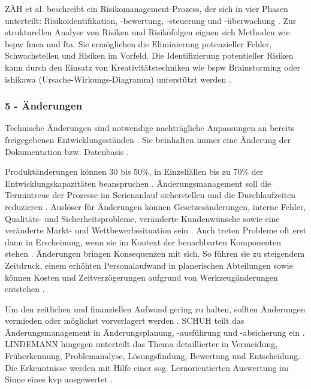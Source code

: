 ZÄH et al. beschreibt ein Risikomanagement-Prozess, der sich in vier Phasen unterteilt: Risikoidentifikation, -bewertung, -steuerung und -überwachung \cite{Zaeh2004}. 
Zur strukturellen Analyse von Risiken und Risikofolgen eignen sich  Methoden wie \gls{bspw} \gls{fmea} und \gls{fta}. Sie ermöglichen die Eliminierung potenzieller Fehler, Schwachstellen und Risiken im Vorfeld.
Die Identifizierung potentieller Risiken kann durch den Einsatz von Kreativitätstechniken wie \gls{bspw} Brainstorming oder \gls{ishikawa} (Ursache-Wirkungs-Diagramm) unterstützt werden \cite[41]{Bischoff2007}. 

\subsubsection*{5 - Änderungen}

Technische Änderungen sind notwendige nachträgliche Anpassungen an bereits freigegebenen Entwicklungsständen \cite{Zanner2002}. Sie beinhalten immer eine Änderung der Dokumentation bzw. Datenbasis \cite[47]{Niemerg1997}. 	

Produktänderungen können 30 bis 50\%, in Einzelfällen bis zu 70\% der Entwicklungskapazitäten beanspruchen \cite[2]{Lindemann1998}.
Änderungsmanagement soll die Termintreue der Prozesse im Serienanlauf sicherstellen und die Durchlaufzeiten reduzieren \cite[216]{Schuh2008}. 
Auslöser für Änderungen können Gesetzesänderungen, interne Fehler, Qualitäts- und Sicherheitsprobleme, veränderte Kundenwünsche sowie eine veränderte Markt- und Wettbewerbssituation sein \cite{Zanner2002}. Auch treten Probleme oft erst dann in Erscheinung, wenn sie im Kontext der benachbarten Komponenten stehen \cite[24]{Kuhn2002}.
Änderungen bringen Konsequenzen mit sich. So führen sie zu steigendem Zeitdruck, einem erhöhten Personalaufwand in planerischen Abteilungen sowie können Kosten und Zeitverzögerungen aufgrund von Werkzeugänderungen entstehen \cite[24]{Kuhn2002}. 

Um den zeitlichen und finanziellen Aufwand gering zu halten, sollten Änderungen vermieden oder möglichst vorverlagert werden \cite{Schuh2008, Jania2004, Ass98}. 
SCHUH teilt das Änderungsmanagement in Änderungsplanung, -ausführung und -absicherung ein \cite[217]{Schuh2008}. 
LINDEMANN hingegen unterteilt das Thema detaillierter in Vermeidung, Früherkennung, Problemanalyse, Lösungsfindung, Bewertung und Entscheidung. Die Erkenntnisse werden mit Hilfe einer sog. Lernorientierten Auswertung im Sinne eines \gls{kvp} ausgewertet \cite{Lindemann1998}. 

